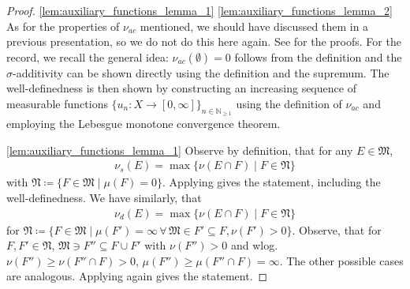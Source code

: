\documentclass[10pt, leqno]{amsart}
\theoremstyle{definition}
\theoremstyle{remark}
\begin{document}
    \begin{proof}
        \ref{lem:auxiliary_functions_lemma_1} \ref{lem:auxiliary_functions_lemma_2} As for the properties of \(\nu_{ac}\) mentioned, we should have discussed them in a previous presentation, so we do not do this here again. See \cite[pp. 56-59]{Fonseca} for the proofs. For the record, we recall the general idea: \(\nu_{ac}(\emptyset) = 0\) follows from the definition and the \(\sigma\)-additivity can be shown directly using the definition and the supremum. The well-definedness is then shown by constructing an increasing sequence of measurable functions \(\{u_n\colon X \to [0, \infty]\}_{n \in \mathbb{N}_{\geq 1}}\) using the definition of \(\nu_{ac}\) and employing the Lebesgue monotone convergence theorem.

        \ref{lem:auxiliary_functions_lemma_1} Observe by definition, that for any \(E \in \mathfrak{M}\),
        \begin{align}
            \nu_s(E) = \max\{\nu(E \cap F) \mid F \in \mathfrak{N}\}
        \end{align}
        with \(\mathfrak{N} \coloneqq \{F \in \mathfrak{M} \mid \mu(F) = 0\}\). Applying  gives the statement, including the well-definedness. We have similarly, that
        \begin{align}
            \nu_d(E) = \max\{\nu(E \cap F) \mid F \in \mathfrak{N}\}
        \end{align}
        for \(\mathfrak{N} \coloneqq \{F \in \mathfrak{M} \mid \mu(F') = \infty \, \forall \, \mathfrak{M} \in F' \subseteq F, \nu(F') > 0 \}\). Observe, that for \(F, F' \in \mathfrak{N}\), \(\mathfrak{M} \ni F'' \subseteq F \cup F'\) with \(\nu(F'') > 0\) and wlog. \(\nu(F'') \geq \nu(F'' \cap F) > 0\), \(\mu(F'') \geq \mu(F'' \cap F) = \infty\). The other possible cases are analogous. Applying  again gives the statement.


\end{proof}
\end{document}
